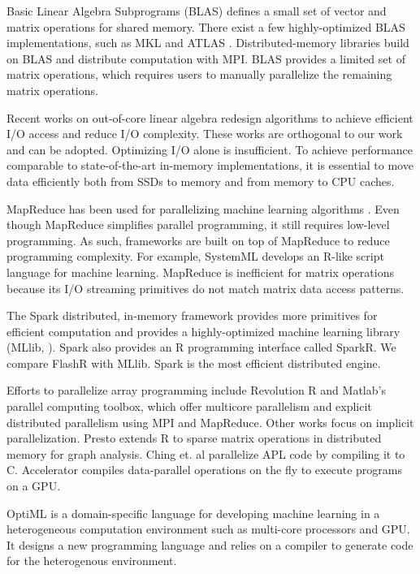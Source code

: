 Basic Linear Algebra Subprograms (BLAS) defines a small set of vector and
matrix operations for shared memory. There exist a few highly-optimized BLAS
implementations, such as MKL \cite{mkl} and ATLAS \cite{atlas}. 
Distributed-memory libraries \cite{trilinos, petsc, elemental}
build on BLAS and distribute computation with MPI.
BLAS provides a limited set of matrix operations, which requires
users to manually parallelize the remaining matrix operations.

Recent works on out-of-core linear algebra \cite{Toledo99, Quintana-Orti12}
redesign algorithms to achieve efficient I/O access and reduce I/O
complexity. These works are orthogonal to our work and can be adopted.
Optimizing I/O
alone is insufficient. To achieve performance comparable to state-of-the-art
in-memory implementations, it is essential to move data efficiently both from
SSDs to memory and from memory to CPU caches.

MapReduce \cite{mapreduce} has been used for parallelizing machine learning
algorithms \cite{Chu06}. Even though MapReduce simplifies parallel programming,
it still requires low-level programming.
As such, frameworks are built on top of MapReduce to reduce programming complexity.
For example, SystemML \cite{systemml} develops an R-like script language for
machine learning. MapReduce is inefficient for matrix operations because
its I/O streaming primitives do not match matrix data access patterns.

The Spark \cite{spark} distributed, in-memory framework provides more primitives
for efficient computation and provides a highly-optimized machine learning library
(MLlib, \cite{mllib}).
Spark also provides an R programming interface called SparkR.  
We compare FlashR with MLlib. Spark is the most efficient distributed engine.

Efforts to parallelize array programming include
Revolution R \cite{rro} and Matlab's parallel computing toolbox, which
offer multicore parallelism and explicit distributed parallelism using MPI and MapReduce. 
Other works focus on implicit parallelization.
Presto \cite{presto} extends R to sparse matrix operations in distributed memory for graph
analysis. Ching et. al \cite{Ching12} parallelize APL code by
compiling it to C. Accelerator \cite{accelerator} compiles
data-parallel operations on the fly to execute programs on a GPU.

OptiML \cite{optiml} is a domain-specific language for developing machine
learning in a heterogeneous computation environment such as multi-core
processors and GPU. It designs a new programming language and relies on
a compiler to generate code for the heterogenous environment.
